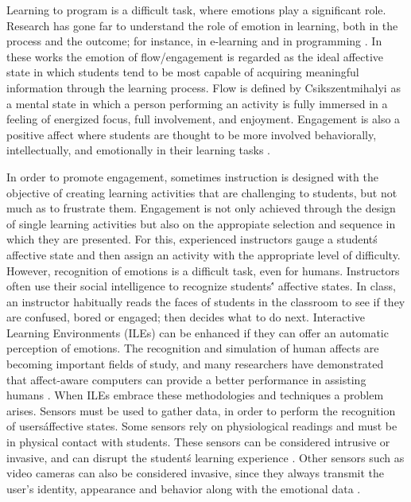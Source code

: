 \documentclass[a4paper,twoside]{article}
\begin{document}
Learning to program is a difficult task, where emotions play a significant
role. Research has gone far to understand the role of emotion in learning, both
in the process and the outcome; for instance, in e-learning
\cite{kort2001affective, rossin2009effects}
and in programming  \cite{rodrigo2009affective, jenkins2001motivation ,
bosch2013emotions, khan2007mood}. In these works the emotion of flow/engagement
is regarded as the ideal affective state in which
students tend to be most capable of acquiring meaningful information through the
learning process. Flow is defined by Csikszentmihalyi \cite{csikszentmihalyi1990flow}
as a mental state in which a person performing an activity is fully immersed in a feeling of energized focus, full involvement, and enjoyment. Engagement is
also a positive affect where students are thought to be more involved
behaviorally, intellectually, and emotionally in their learning tasks
\cite{bangert2002teacher}.

In order to promote engagement, sometimes instruction is designed with the
objective of creating learning activities that are challenging to students, but
not much as to frustrate them. Engagement is not only achieved through the
design of single learning activities but also on the appropiate selection and
sequence in which they are presented.
For this, experienced instructors gauge a student\'s affective state and then
assign an activity with the appropriate level of difficulty. However,
recognition of emotions is a difficult task, even
for humans. Instructors often use their social intelligence to recognize
students\'' affective states. In class, an instructor habitually reads the
faces of students in the classroom to see if they are confused, bored or
engaged; then decides what to do next. Interactive Learning Environments (ILEs)
can be enhanced if they can offer an
automatic perception of emotions. The recognition and simulation of human
affects are becoming important fields of study, and many researchers have
demonstrated that affect-aware computers can provide a better performance in
assisting humans \cite{picard2001toward}. When ILEs embrace these methodologies
and techniques a
problem arises. Sensors must be used to gather data, in order to perform the
recognition of users\' affective states.
Some sensors rely on physiological readings
and must be in physical contact with students.
These sensors can be considered
intrusive or invasive, and can disrupt the student\'s learning experience
\cite{zhai2008stress, sidney2005integrating, arroyo2009emotion}.
Other sensors such as video cameras can also be considered invasive, since
they always transmit the user's identity, appearance and behavior along with
the emotional data \cite{picard2001toward}.
\end{document}
